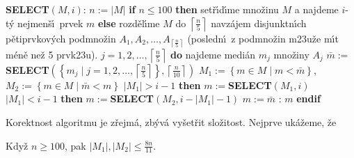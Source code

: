 {\bf SELECT$\left(M,i\right)$}:\newline 
$n:=|M|$\newline 
{\bf if} $n\le 100$ {\bf then}\newline 
\phantom{---}set\v r\'\i d\'\i me mno\v zinu $M$ a najdeme $i$-t\'y 
nejmen\v s\'\i\ prvek $m$\newline 
{\bf else}\newline
\phantom{---}rozd\v el\'\i me $M$ do $\left\lceil\frac n5\right\rceil$ navz\'ajem disjunktn\'\i ch p\v etiprvko\-v\'ych podmno\v zin\newline 
\phantom{---}$A_1,A_2,\dots,A_{\left\lceil\frac n5\right\rceil}$ (posledn\'\i\ z 
podmno\v zin m\accent23u\v ze m\'\i t m\'en\v e ne\v z 5 prvk\accent23u).\newline 
\phantom{---}{\bf for every} $j=1,2,\dots,\left\lceil\frac n5\right\rceil$ {\bf do}\newline 
\phantom{------}najdeme medi\'an $m_j$ mno\v ziny $A_j$\newline 
\phantom{---}{\bf enddo}\newline 
\phantom{---}$\bar {m}:=${\bf SELECT}$\left(\left\{m_j\mid j=1,2,\dots,\left\lceil\frac n5\right\rceil \right\}
,\left\lceil\frac n{10}\right\rceil \right)$\newline 
\phantom{---}$M_1:=\left\{m\in M\mid m<\bar {m}\right\}$, $M_2:=\left\{m\in M\mid\bar {m}<m\right\}$\newline 
\phantom{---}{\bf if} $|M_1|>i-1$ {\bf then}\newline 
\phantom{------}$m:=${\bf SELECT}$\left(M_1,i\right)$\newline 
\phantom{---}{\bf else}\newline 
\phantom{------}{\bf if} $|M_1|<i-1$ {\bf then}\newline 
\phantom{---------}$m:=${\bf SELECT}$\left(M_2,i-|M_1|-1\right)$\newline 
\phantom{------}{\bf else}\newline 
\phantom{---------}$m:=\bar {m}$\newline 
\phantom{------}{\bf endif}\newline 
\phantom{---}{\bf endif}\newline 
\phantom{---}{\bf V\'ystup}: $m$\newline 
{\bf endif}
\medskip

\flushpar Korektnost algoritmu je z\v rejm\'a, zb\'yv\'a vy\v set\v rit 
slo\v zitost. Nej\-prve uk\'a\v zeme, \v ze

Kdy\v z $n\ge 100$, pak $|M_1|,|M_2|\le\frac {8n}{
11}$.
\endproclaim

